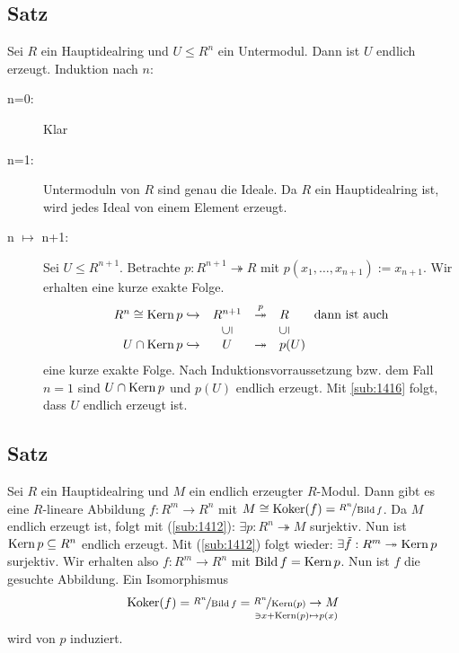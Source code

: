\subsection[Satz über Untermoduln von $R^n$, wenn $R$ Hauptidealring ist]{Satz} %
\label{sub:1417}
Sei $R$ ein Hauptidealring und $U \le R^n$ ein Untermodul. Dann ist $U$ endlich erzeugt. 
Induktion nach $n$:
\begin{description}
	\item[n=0:] Klar
	\item[n=1:] Untermoduln  von $R$ sind genau die Ideale. Da $R$ ein Hauptidealring ist, wird jedes Ideal von einem Element erzeugt.
	\item[n $\mapsto$ n+1:] Sei $U \le R^{n+1}$. Betrachte $p : R^{n+1} \twoheadrightarrow R$ mit $p(x_1, \ldots , x_{n+1}) := x_{n+1}$. Wir erhalten eine kurze exakte 
	Folge. 
	\[
		\begin{array}{rccl}
			R^n \cong \Kern p \hookrightarrow  & R^{n+1} & \overset{p}{\twoheadrightarrow} & R  \tag*{dann ist auch}\\
			 & \rotatebox[origin=c]{90}{$\subseteq$}  &  &  \rotatebox[origin=c]{90}{$\subseteq$}  \\
			 U \cap \Kern p\hookrightarrow & U &  \twoheadrightarrow  &p(U)
		\end{array}
	\]
	eine kurze exakte Folge. Nach Induktionsvorraussetzung bzw. dem Fall $n=1$ sind $U \cap \operatorname{Kern} p$ und $p(U)$ endlich erzeugt. Mit \ref{sub:1416} folgt, dass $U$
	endlich erzeugt ist. \bewende
\end{description}

\subsection{Satz} %
\label{sub:1418}
Sei $R$ ein Hauptidealring und $M$ ein endlich erzeugter $R$-Modul. Dann gibt es eine $R$-lineare Abbildung $f : R^m \to R^n$ mit 
$M \cong \operatorname{Koker} (f) =  \nicefrac{R^n}{\operatorname{Bild} f}$.
Da $M$ endlich erzeugt ist, folgt mit (\ref{sub:1412}): $\exists p : R^n \twoheadrightarrow M$ surjektiv. Nun ist $\operatorname{Kern} p \subseteq R^n$ endlich erzeugt. Mit 
(\ref{sub:1412}) folgt wieder: $\exists \tilde f : R^m \twoheadrightarrow \operatorname{Kern} p$ surjektiv. Wir erhalten also $f : R^m \to R^n$ mit $\operatorname{Bild} f = \operatorname{Kern} p$. Nun ist 
$f$ die gesuchte Abbildung. Ein Isomorphismus 
\[
	\operatorname{Koker} (f) = \nicefrac{R^n}{\operatorname{Bild} f} = \underset{\ni x + \operatorname{Kern} (p) \mapsto p(x)}{\nicefrac{R^n}{\operatorname{Kern} (p)} \to M}
\]
wird von $p$ induziert. \bewende


